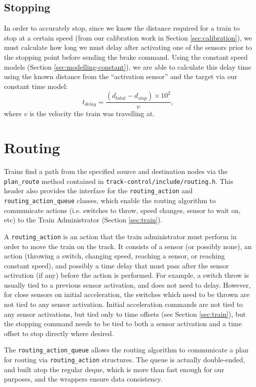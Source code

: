 \documentclass[12pt, titlepage]{article}
\begin{document}
    \subsection{Stopping}
    
    In order to accurately stop, since we know the distance required for a train to stop at a certain speed (from our calibration work in Section \ref{sec:calibration}), we must calculate how long we must delay after activating one of the sensors prior to the stopping point before sending the brake command. Using the constant speed models (Section \ref{sec:modelling-constant}), we are able to calculate this delay time using the known distance from the ``activation sensor'' and the target via our constant time model:
    \[
        t_{delay} = \frac{(d_{total} - d_{stop}) \times 10^2}{v},
    \]
    where $v$ is the velocity the train was travelling at.

    \section{Routing}
    \label{sec:routing}
    
    Trains find a path from the specified source and destination nodes via the \verb`plan_route` method contained in \verb`track-control/include/routing.h`. This header also provides the interface for the \verb`routing_action` and \verb`routing_action_queue` classes, which enable the routing algorithm to communicate actions (i.e. switches to throw, speed changes, sensor to wait on, etc) to the Train Administrator (Section \ref{sec:train}).
    
    A \verb`routing_action` is an action that the train administrator must perform in order to move the train on the track. It consists of a sensor (or possibly none), an action (throwing a switch, changing speed, reaching a sensor, or reaching constant speed), and possibly a time delay that must pass after the sensor activation (if any) before the action is performed. For example, a switch throw is usually tied to a previous sensor activation, and does not need to delay. However, for close sensors on initial acceleration, the switches which need to be thrown are not tied to any sensor activation. Initial acceleration commands are not tied to any sensor activations, but tied only to time offsets (see Section \ref{sec:train}), but the stopping command needs to be tied to both a sensor activation and a time offset to stop directly where desired.
    
    The \verb`routing_action_queue` allows the routing algorithm to communicate a plan for routing via \verb`routing_action` structures. The queue is actually double-ended, and built atop the regular deque, which is more than fast enough for our purposes, and the wrappers ensure data consistency.
    
\end{document}
